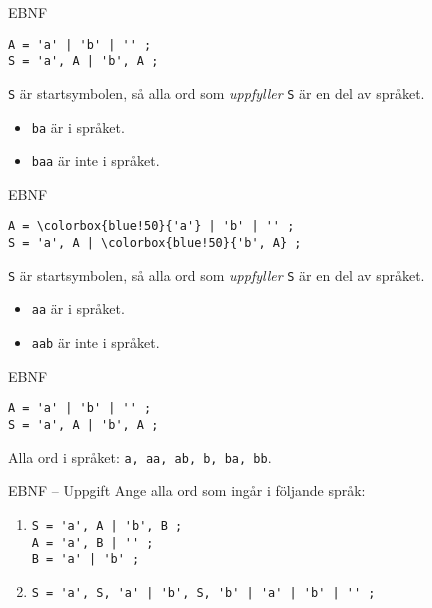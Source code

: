 \documentclass{beamer}
\begin{document}
  \begin{frame}[fragile]{EBNF}
    \begin{Verbatim}[commandchars=\\\{\}]
A = 'a' | 'b' | '' ;
S = 'a', A | 'b', A ;
    \end{Verbatim}

    \texttt{S} är startsymbolen, så alla ord som \emph{uppfyller} \texttt{S} är
    en del av språket.

    \begin{itemize}
      \item \texttt{ba} är i språket.
      \item \texttt{baa} är inte i språket.
    \end{itemize}

  \end{frame}

  \begin{frame}[fragile]{EBNF}
    \begin{Verbatim}[commandchars=\\\{\}]
A = \colorbox{blue!50}{'a'} | 'b' | '' ;
S = 'a', A | \colorbox{blue!50}{'b', A} ;
    \end{Verbatim}

    \texttt{S} är startsymbolen, så alla ord som \emph{uppfyller} \texttt{S} är
    en del av språket.

    \begin{itemize}
      \item \texttt{aa} är i språket.
      \item \texttt{aab} är inte i språket.
    \end{itemize}

  \end{frame}

  \begin{frame}[fragile]{EBNF}
    \begin{Verbatim}[commandchars=\\\{\}]
A = 'a' | 'b' | '' ;
S = 'a', A | 'b', A ;
    \end{Verbatim}

    Alla ord i språket: \texttt{a, aa, ab, b, ba, bb}.
  \end{frame}

  \begin{frame}[fragile]{EBNF -- Uppgift}
    Ange alla ord som ingår i följande språk:

    \begin{enumerate}
      \item \begin{Verbatim}
S = 'a', A | 'b', B ;
A = 'a', B | '' ;
B = 'a' | 'b' ;
      \end{Verbatim}
      \item \begin{Verbatim}
S = 'a', S, 'a' | 'b', S, 'b' | 'a' | 'b' | '' ;
      \end{Verbatim}
    \end{enumerate}
  \end{frame}
\end{document}
